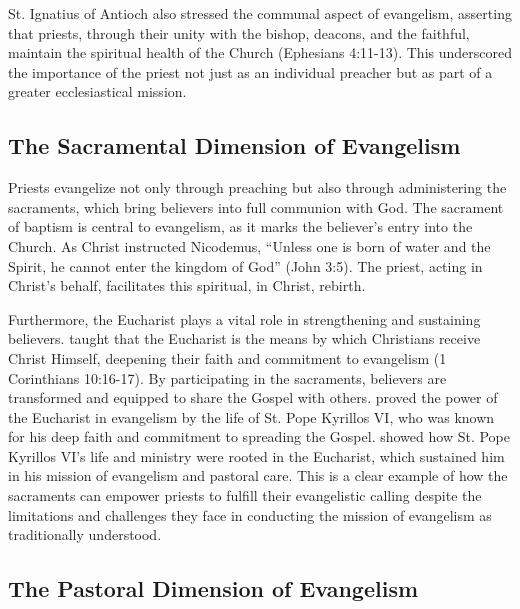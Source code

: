 \documentclass[12pt, doc]{apa7}   	%
\begin{document}
St. Ignatius of Antioch also stressed the communal aspect of evangelism, asserting that priests, through their unity with the bishop, deacons, and the faithful, maintain the spiritual health of the Church (Ephesians 4:11-13). This underscored the importance of the priest not just as an individual preacher but as part of a greater ecclesiastical mission.

\subsection{The Sacramental Dimension of Evangelism}

Priests evangelize not only through preaching but also through administering the sacraments, which bring believers into full communion with God. The sacrament of baptism is central to evangelism, as it marks the believer’s entry into the Church. As Christ instructed Nicodemus, “Unless one is born of water and the Spirit, he cannot enter the kingdom of God” (John 3:5). The priest, acting in Christ’s behalf, facilitates this spiritual, in Christ, rebirth.

Furthermore, the Eucharist plays a vital role in strengthening and sustaining believers. \citet{st_basil_letters} taught that the Eucharist is the means by which Christians receive Christ Himself, deepening their faith and commitment to evangelism (1 Corinthians 10:16-17). By participating in the sacraments, believers are transformed and equipped to share the Gospel with others.  \citet{fanous_silent_patriarch} proved the power of the Eucharist in evangelism by the life of St. Pope Kyrillos VI, who was known for his deep faith and commitment to spreading the Gospel.  \citeauthor{fanous_silent_patriarch} showed how St. Pope Kyrillos VI’s life and ministry were rooted in the Eucharist, which sustained him in his mission of evangelism and pastoral care.  This is a clear example of how the sacraments can empower priests to fulfill their evangelistic calling despite the limitations and challenges they face in conducting the mission of evangelism as traditionally understood.

\subsection{The Pastoral Dimension of Evangelism}
\end{document}
